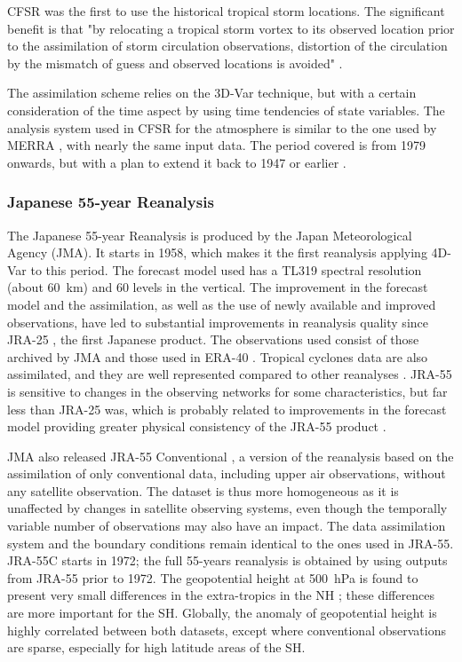 \documentclass{ametsoc}
\begin{document}
	CFSR was the first to use the historical tropical storm locations. The significant benefit is that "by relocating a tropical storm vortex to its observed location prior to the assimilation of storm circulation observations, distortion of the circulation by the mismatch of guess and observed locations is avoided" \citep{Saha2010a}.
	
	The assimilation scheme relies on the 3D-Var technique, but with a certain consideration of the time aspect by using time tendencies of state variables. The analysis system used in CFSR for the atmosphere is similar to the one used by MERRA \citep{Rienecker2011}, with nearly the same input data. The period covered is from 1979 onwards, but with a plan to extend it back to 1947 or earlier \citep{Saha2010a}.
	
	
	\subsubsection{Japanese 55-year Reanalysis}
	
	The Japanese 55-year Reanalysis \citep[JRA-55 --][]{Kobayashi2015, Harada2016} is produced by the Japan Meteorological Agency (JMA). It starts in 1958, which makes it the first reanalysis applying 4D-Var to this period. The forecast model used has a TL319 spectral resolution (about 60~km) and 60 levels in the vertical. The improvement in the forecast model and the assimilation, as well as the use of newly available and improved observations, have led to substantial improvements in reanalysis quality since JRA-25 \citep{Onogi2007}, the first Japanese product. The observations used consist of those archived by JMA and those used in ERA-40 \citep{Uppala2005}. Tropical cyclones data are also assimilated, and they are well represented compared to other reanalyses \citep{Harada2016}. JRA-55 is sensitive to changes in the observing networks for some characteristics, but far less than JRA-25 was, which is probably related to improvements in the forecast model providing greater physical consistency of the JRA-55 product \citep{Kobayashi2015}.
	
	JMA also released JRA-55 Conventional \citep[JRA-55C --][]{Kobayashi2014}, a version of the reanalysis based on the assimilation of only conventional data, including upper air observations, without any satellite observation. The dataset is thus more homogeneous as it is unaffected by changes in satellite observing systems, even though the temporally variable number of observations may also have an impact. The data assimilation system and the boundary conditions remain identical to the ones used in JRA-55. JRA-55C starts in 1972; the full 55-years reanalysis is obtained by using outputs from JRA-55 prior to 1972. The geopotential height at 500~hPa is found to present very small differences in the extra-tropics in the NH \citep{Kobayashi2014}; these differences are more important for the SH. Globally, the anomaly of geopotential height is highly correlated between both datasets, except where conventional observations are sparse, especially for high latitude areas of the SH.
	
\end{document}
